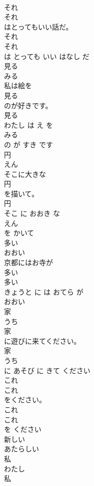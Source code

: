 \documentclass[8pt]{extreport}
\begin{document}
\begin{CJK}{UTF8}{min}
\\	それ	
\\	それ
\\	はとってもいい話だ。	
\\	それ 
\\	それ
\\	は とっても いい はなし だ	
\\	見る	
\\	みる	
\\	私は絵を
\\	見る
\\	のが好きです。	
\\	見る 
\\	わたし は え を 
\\	みる
\\	の が すき です	
\\	円	
\\	えん	
\\	そこに大きな
\\	円
\\	を描いて。	
\\	円 
\\	そこ に おおき な 
\\	えん
\\	を かいて	
\\	多い	
\\	おおい	
\\	京都にはお寺が
\\	多い
\\	多い 
\\	きょうと に は おてら が 
\\	おおい
\\	家	
\\	うち	
\\	家
\\	に遊びに来てください。	
\\	家 
\\	うち
\\	に あそび に きて ください	
\\	これ	
\\	これ
\\	をください。	
\\	これ 
\\	これ
\\	を ください	
\\	新しい	
\\	あたらしい	
\\	私	
\\	わたし	
\\	私

\end{CJK}
\end{document}
